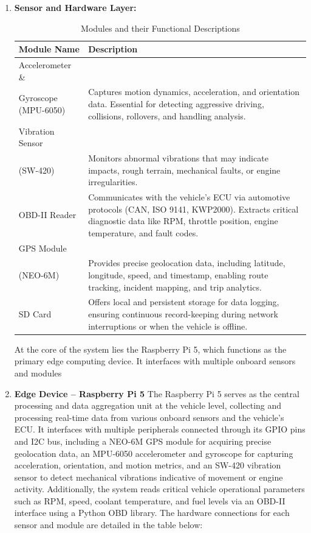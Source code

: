 \begin{enumerate}
    \item \textbf{Sensor and Hardware Layer:}
        \begin{table}[h!]\centering
            \caption{Modules and their Functional Descriptions}
            \label{tab:module_descriptions} 
            \begin{tabular}{|p{4.5cm}|p{10cm}|}
            \hline
            \textbf{Module Name} & \textbf{Description} \\
            \hline
            Accelerometer \& \\Gyroscope (MPU-6050) & Captures motion dynamics, acceleration, and orientation data. Essential for detecting aggressive driving, collisions, rollovers, and handling analysis. \\
            \hline
            Vibration Sensor \\(SW-420) & Monitors abnormal vibrations that may indicate impacts, rough terrain, mechanical faults, or engine irregularities. \\
            \hline
            OBD-II Reader & Communicates with the vehicle’s ECU via automotive protocols (CAN, ISO 9141, KWP2000). Extracts critical diagnostic data like RPM, throttle position, engine temperature, and fault codes. \\
            \hline
            GPS Module \\(NEO-6M) & Provides precise geolocation data, including latitude, longitude, speed, and timestamp, enabling route tracking, incident mapping, and trip analytics. \\
            \hline
            SD Card & Offers local and persistent storage for data logging, ensuring continuous record-keeping during network interruptions or when the vehicle is offline. \\
            \hline
            \end{tabular}
        \end{table}    
        At the core of the system lies the Raspberry Pi 5, which functions as the primary edge computing device. It interfaces with multiple onboard sensors and modules
    \item \textbf{Edge Device – Raspberry Pi 5} 
        The Raspberry Pi 5 serves as the central processing and data aggregation unit at the vehicle level, collecting and processing real-time data from various onboard sensors and the vehicle’s ECU. It interfaces with multiple peripherals connected through its GPIO pins and I2C bus, including a NEO-6M GPS module for acquiring precise geolocation data, an MPU-6050 accelerometer and gyroscope for capturing acceleration, orientation, and motion metrics, and an SW-420 vibration sensor to detect mechanical vibrations indicative of movement or engine activity. Additionally, the system reads critical vehicle operational parameters such as RPM, speed, coolant temperature, and fuel levels via an OBD-II interface using a Python OBD library. The hardware connections for each sensor and module are detailed in the table below:

\end{enumerate}
